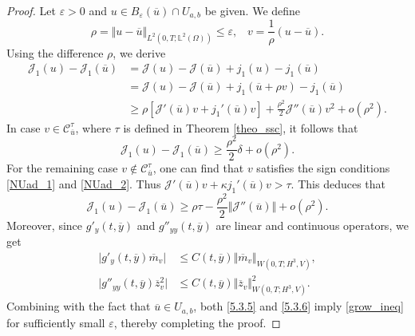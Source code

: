 \documentclass[reqno]{amsart}
\begin{document}
	\begin{proof}
		Let $\varepsilon>0$ and $u\in B_\varepsilon(\overline{u}) \cap U_{a,b}$ be given. We define 
		\begin{equation*}
			\rho = \Vert u - \overline{u} \Vert_{L^2(0,T;\mathbb{L}^2(\Omega)) } \leq \varepsilon, \hspace{10pt} v=\frac{1}{\rho}(u-\overline{u}).
		\end{equation*}
		Using the difference $\rho$, we derive
		\begin{align*}
			\mathcal{J}_1 (u) - \mathcal{J}_1 (\overline{u}) &= \mathcal{J}(u) - \mathcal{J}(\overline{u}) + j_1 (u) - j_1 (\overline{u}) \\
			&= \mathcal{J}(u) - \mathcal{J}(\overline{u}) + j_1 (\overline{u}+\rho v) - j_1 (\overline{u}) \\
			&\geq \rho \left[ \mathcal{J}'(\overline{u})v + j_1'(\overline{u})v \right] + \frac{\rho^2}{2} \mathcal{J}''(\overline{u})v^2 + o(\rho^2) .
		\end{align*}
		In case $v \in \mathcal{C}_{\overline{u}}^\tau$, where $\tau$ is defined in Theorem \ref{theo_ssc}, it follows that
		\begin{equation} \label{5.3.5}
			\mathcal{J}_1(u) - \mathcal{J}_1(\overline{u}) \geq \frac{\rho^2}{2} \delta + o(\rho^2).
		\end{equation}
		For the remaining case $v \notin \mathcal{C}_{\overline{u}}^\tau$, one can find that $v$ satisfies the sign conditions \eqref{NUad_1} and \eqref{NUad_2}. Thus $\displaystyle \mathcal{J}'(\overline{u})v+\kappa j_1'(\overline{u})v > \tau$. This deduces that
		\begin{equation} \label{5.3.6}
			\mathcal{J}_1(u) - \mathcal{J}_1(\overline{u}) \geq \rho \tau - \frac{\rho^2}{2} \Vert \mathcal{J}''(\overline{u}) \Vert + o(\rho^2).
		\end{equation} 
		Moreover, since $g'_y(t,\overline{y})$ and $g''_{yy}(t,\overline{y})$ are linear and continuous operators, we get
		\begin{align*}
			\vert g'_y(t,\overline{y})\overline{m}_v \vert &\leq C(t,\overline{y}) \Vert \overline{m}_v \Vert_{W(0,T;H^3,V)},\\
			\vert g''_{yy}(t,\overline{y})\overline{z}_v^2 \vert &\leq C(t,\overline{y}) \Vert \overline{z}_v \Vert^2_{W(0,T;H^3,V)}.
		\end{align*}
		Combining with the fact that $\overline{u} \in U_{a, b}$, both \eqref{5.3.5} and \eqref{5.3.6} imply \eqref{grow_ineq} for sufficiently small $\varepsilon$, thereby completing the proof.
	\end{proof}
	
\end{document}
